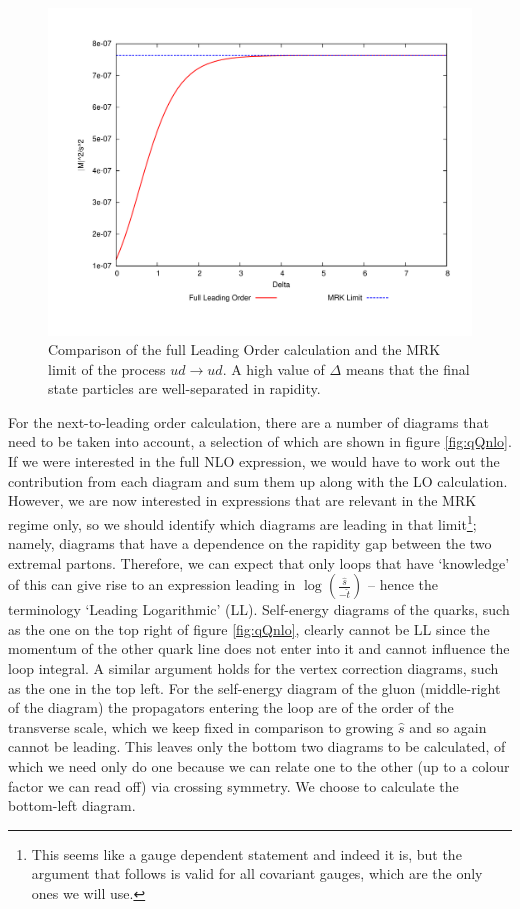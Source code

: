 \begin{figure}[t]
\centering
\includegraphics[scale=0.5]{Images/ud_ud_plots.pdf} 
\caption{Comparison of the full Leading Order calculation and the MRK limit of the process $ud \to ud$. A high value of $\Delta$ means that the final state particles are well-separated in rapidity.}
\label{fig:qQ_LO_MRK}
\end{figure}

For the next-to-leading order calculation, there are a number of diagrams that need to be taken into account, a selection of which are shown in figure \ref{fig:qQnlo}. If we were interested in the full NLO expression, we would have to work out the contribution from each diagram and sum them up along with the LO calculation. However, we are now interested in expressions that are relevant in the MRK regime only, so we should identify which diagrams are leading in that limit\footnote{This seems like a gauge dependent statement and indeed it is, but the argument that follows is valid for all covariant gauges, which are the only ones we will use.}; namely, diagrams that have a dependence on the rapidity gap between the two extremal partons. Therefore, we can expect that only loops that have `knowledge' of this can give rise to an expression leading in $\log(\frac{\hat{s}}{-\hat{t}})$ -- hence the terminology `Leading Logarithmic' (LL). Self-energy diagrams of the quarks, such as the one on the top right of figure \ref{fig:qQnlo}, clearly cannot be LL since the momentum of the other quark line does not enter into it and cannot influence the loop integral. A similar argument holds for the vertex correction diagrams, such as the one in the top left. For the self-energy diagram of the gluon (middle-right of the diagram) the propagators entering the loop are of the order of the transverse scale, which we keep fixed in comparison to growing $\hat{s}$ and so again cannot be leading. This leaves only the bottom two diagrams to be calculated, of which we need only do one because we can relate one to the other (up to a colour factor we can read off) via crossing symmetry. We choose to calculate the bottom-left diagram.

